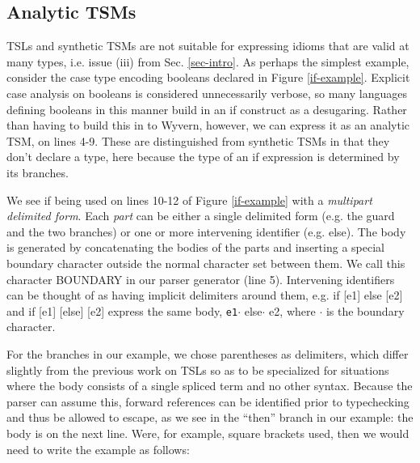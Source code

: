 \documentclass{sig-alternate}[10pt]
\makeatletter
\newcommand\BeraMonottfamily{%
  \def\fvm@Scale{0.85}%
  \fontfamily{fvm}\selectfont%
}
\newcommand{\lstinlinew}[1]{{\scriptsize\BeraMonottfamily #1}}
\makeatother
\begin{document}



\subsection{Analytic TSMs}
TSLs and synthetic TSMs are not suitable for expressing idioms that are valid at many types, i.e. issue (iii) from Sec. \ref{sec-intro}. As perhaps the simplest example, consider the case type encoding booleans declared in Figure \ref{if-example}. Explicit case analysis on booleans is considered unnecessarily verbose, so many languages defining booleans in this manner build in an \lstinlinew{if} construct as a desugaring. Rather than having to build this in to Wyvern, however, we can express it as an analytic TSM, on lines 4-9. These are distinguished from synthetic TSMs in that they don't declare a type, here because the type of an \lstinlinew{if} expression is determined by its branches. 

We see \lstinlinew{if} being used on lines 10-12 of Figure \ref{if-example} with a \emph{multipart delimited form}. Each \emph{part} can be either a single delimited form (e.g. the guard and the two branches) or one or more intervening identifier (e.g. \lstinlinew{else}). The body is generated by concatenating the bodies of the parts and inserting a special boundary character outside the normal character set between them. We call this character \lstinlinew{BOUNDARY} in our parser generator (line 5). Intervening identifiers can be thought of as having implicit delimiters around them, e.g. \lstinlinew{if [e1] else [e2]} and \lstinlinew{if [e1] [else] [e2]} express the same body, \texttt{e1}$\cdot$\lstinlinew{else}$\cdot$\lstinlinew{e2}, where $\cdot$ is the boundary character.

For the branches in our example, we chose parentheses as delimiters, which  differ slightly from the previous work on TSLs so as to be specialized for situations where the body consists of a single spliced term and no other syntax. Because the parser can assume this, forward references can be identified prior to typechecking and thus be allowed to escape, as we see in the ``then'' branch in our example: the body is on the next line. Were, for example, square brackets used, then we would need to write the example as follows:
\end{document}
